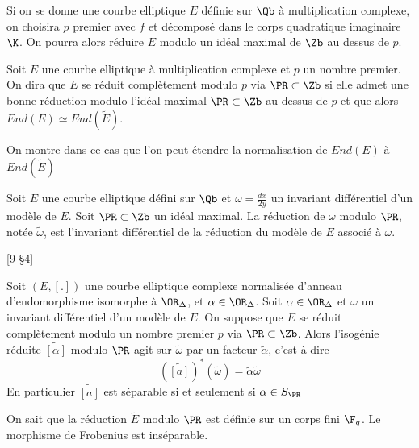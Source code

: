 Si on se donne une courbe elliptique $E$ définie sur $\Qb$ à multiplication complexe, on choisira $p$ premier avec $f$ et décomposé dans le corps quadratique imaginaire $\K$. On pourra alors réduire $E$ modulo un idéal maximal de $\Zb$ au dessus de $p$.

\begin{Def}
	Soit $E$ une courbe elliptique à multiplication complexe et $p$ un nombre premier. On dira que $E$ se réduit complètement modulo $p$ via $\PR\subset\Zb$ si elle admet une bonne réduction modulo l'idéal maximal $\PR\subset\Zb$ au dessus de $p$ et que alors $End(E)\simeq End(\tilde{E})$.
\end{Def}

On montre dans ce cas que l'on peut étendre la normalisation de $End(E)$ à $End(\tilde{E})$

\begin{Def}
	Soit $E$ une courbe elliptique défini sur $\Qb$ et $\omega = \frac{dx}{2y}$ un invariant différentiel d'un modèle de $E$. Soit $\PR\subset\Zb$ un idéal maximal. La réduction de $\omega$ modulo $\PR$, notée $\tilde{\omega}$, est l'invariant différentiel de la réduction du modèle de $E$ associé à $\omega$. 
\end{Def}

\begin{Prop}\cite{Lang1987}[9 \S4]
	
	Soit $(E,[.])$ une courbe elliptique complexe normalisée d'anneau d'endomorphisme isomorphe à $\OR_{\Delta}$, et $\alpha\in\OR_{\Delta}$. Soit $\alpha\in\OR_{\Delta}$ et $\omega$ un invariant différentiel d'un modèle de $E$. On suppose que $E$ se réduit complètement modulo un nombre premier $p$ via $\PR\subset\Zb$. Alors l'isogénie réduite $\widetilde{\left[ \alpha\right] }$ modulo $\PR$ agit sur $\tilde{\omega}$ par un facteur $\tilde{\alpha}$, c'est à dire
	\begin{equation*}
		\left( \widetilde{\left[ a\right] }\right)^{*}\left( \tilde{\omega}\right) = \tilde{\alpha}\tilde{\omega}
	\end{equation*}
	En particulier $\widetilde{[a]}$ est séparable si et seulement si $\alpha\in S_{\PR}$
\end{Prop}

On sait que la réduction $\tilde{E}$ modulo $\PR$ est définie sur un corps fini $\F_{q}$. Le morphisme de Frobenius est inséparable.

